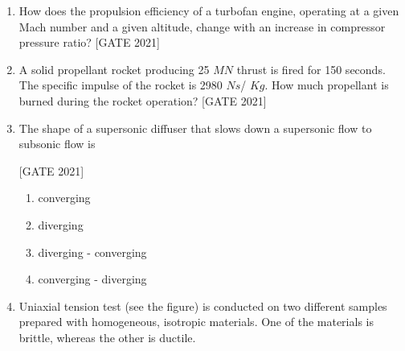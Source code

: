 \documentclass[journal,12pt,onecolumn]{IEEEtran}
\theoremstyle{remark}
\begin{document}
\begin{enumerate}
\vspace{1cm}

\item How does the propulsion efficiency of a turbofan engine, operating at a given Mach number and a given altitude, change with an increase in compressor pressure ratio?
\hfill{[GATE 2021]}\begin{enumerate} 
\end{enumerate}

\vspace{1cm}

\item A solid propellant rocket producing 25 $MN$ thrust is fired for 150 seconds. The specific impulse of the rocket is 2980 $Ns$/ $Kg$. How much propellant is burned during the rocket operation?
\hfill{[GATE 2021]}\begin{enumerate} 
\end{enumerate}
\item The shape of a supersonic diffuser that slows down a supersonic flow to subsonic flow is

 \hfill{[GATE 2021]}\begin{multicols}{2}\begin{enumerate}
 \item converging
    \item diverging
 \item diverging - converging
   
   
    \item converging -  diverging
\end{enumerate}
\end{multicols}

\item Uniaxial tension test (see the figure) is conducted on two different samples prepared with homogeneous, isotropic materials. One of the materials is brittle, whereas the other is ductile.






\end{enumerate}
\end{document}
